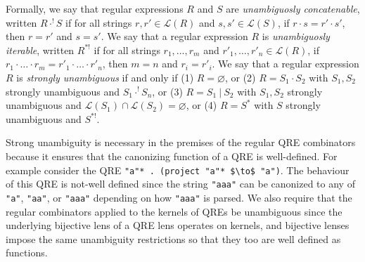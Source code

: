 \documentclass[acmsmall,review,anonymous]{acmart}
\newcommand{\sep}{\ensuremath{\ | \ }}
\newcommand{\cd}[1]{\lstinline[backgroundcolor=\color{white}]$#1$}
\begin{document}
Formally, we say that regular expressions $R$ and $S$ are
\textit{unambiguosly concatenable}, written $R \cdot^! S$ if for all strings
$r, r' \in \mathcal{L}(R)$ and $s, s' \in \mathcal{L}(S)$, if $r \cdot s = r'
\cdot s'$, then $r = r'$ and $s = s'$. We say that a regular expression $R$ is
\textit{unambiguosly iterable}, written $R^{*!}$ if for all strings $r_1,
\ldots, r_m$ and $r'_1, \ldots, r'_n \in \mathcal{L}(R)$, if $r_1 \cdot \ldots
\cdot r_m = r'_1 \cdot \ldots \cdot r'_n$, then $m = n$ and $r_i = r'_i$. We say
that a regular expression $R$ is \textit{strongly unambiguous}\cite{Sippu1988}
if and only if (1) $R = \varnothing$, or (2) $R = S_1 \cdot S_2$ with $S_1,
S_2$ strongly unambiguous and $S_1 \cdot^! S_n$, or (3) $R = S_1 \sep S_2$ with
$S_1, S_2$ strongly unambiguous and $\mathcal{L}(S_1) \cap \mathcal{L}(S_2) =
\varnothing$, or (4) $R = S^*$ with $S$ strongly unambiguous and $S^{*!}$.

Strong unambiguity is necessary in the premises of the regular QRE combinators
because it ensures that the canonizing function of a QRE is well-defined.
For example consider the QRE \lstinline{"a"* . (project "a"* $\to$ "a")}. The
behaviour of this QRE is not-well defined since the string
\cd{"aaa"} can be canonized to any of \cd{"a"}, \cd{"aa"}, or \cd{"aaa"}
depending on how \cd{"aaa"} is parsed. We also require that the regular
combinators applied to the kernels of QREs be unambiguous since the underlying
bijective lens of a QRE lens operates on kernels, and bijective lenses
impose the same unambiguity restrictions so that they too are well defined as
functions.
\end{document}
